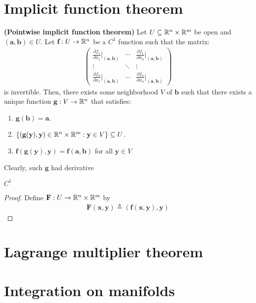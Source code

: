 \documentclass{report}
\begin{document}
\section{Implicit function theorem}
\begin{theorem}
\textbf{(Pointwise implicit function theorem)} Let $U \subseteq \mathbb{R}^n \times \mathbb{R}^m$ be open and $(\textbf{a},\textbf{b}) \in U$. Let $\textbf{f}:U\rightarrow \mathbb{R}^n$ be a $C^1$  function such that the matrix: 
\begin{align*}
\begin{pmatrix} 
  \frac{\partial f_1}{\partial x_1} \Big  |_{(\textbf{a},\textbf{b})} & \cdots & \frac{\partial f_1}{\partial x_n} \Big |_{(\textbf{a},\textbf{b})}  \\
  \vdots & \ddots & \vdots \\
  \frac{\partial f_n}{\partial x_1} \Big|_{(\textbf{a},\textbf{b})} & \cdots & \frac{\partial f_n}{\partial x_n} \Big  |_{(\textbf{a},\textbf{b})} 
\end{pmatrix}
\end{align*}
is invertible. Then, there exists some neighborhood $V$ of $\textbf{b}$ such that there exists a unique function $\textbf{g}:V\rightarrow \mathbb{R}^n$ that satisfies: 
\begin{enumerate}[label=(\alph*)]
  \item $\textbf{g}(\textbf{b})=\textbf{a}$.  
  \item $\left\{  \left(\textbf{g}(\textbf{y}),\textbf{y} \right)\in\mathbb{R}^n \times \mathbb{R}^m: \textbf{y} \in V \right\}\subseteq U$.  
  \item  $\textbf{f}\left( \textbf{g}(\textbf{y}), \textbf{y} \right)= \textbf{f}(\textbf{a},\textbf{b})$ for all $\textbf{y}\in V$  
\end{enumerate}
Clearly, such $\textbf{g}$ had derivative  

$C^1$
\end{theorem}
\begin{proof}
Define $\textbf{F}: U \rightarrow \mathbb{R}^n \times \mathbb{R}^m$ by 
\begin{align*}
\textbf{F}(\textbf{x},\textbf{y})\triangleq \left(\textbf{f}(\textbf{x},\textbf{y}),\textbf{y} \right)
\end{align*}

\end{proof}
\section{Lagrange multiplier theorem}
\section{Integration on manifolds}
\end{document}
